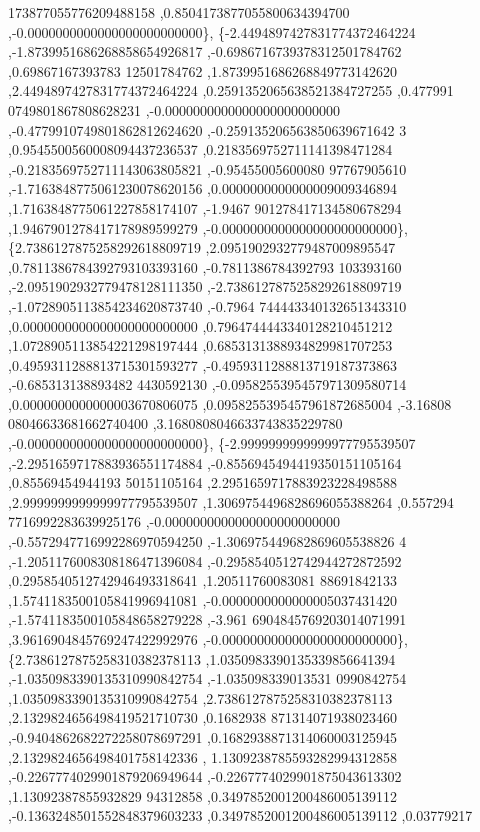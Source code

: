 \begin{DoxyCode}
      173877055776209488158 ,0.8504173877055800634394700 ,-0.0000000000000000000000000\},
\{-2.4494897427831774372464224 ,-1.8739951686268858654926817 ,-0.6986716739378312501784762 ,0.69867167393783
      12501784762 ,1.8739951686268849773142620 ,2.4494897427831774372464224 ,0.2591352065638521384727255 ,0.477991
      0749801867808628231 ,-0.0000000000000000000000000 ,-0.4779910749801862812624620 ,-0.259135206563850639671642
      3 ,0.9545500560008094437236537 ,0.2183569752711141398471284 ,-0.2183569752711143063805821 ,-0.95455005600080
      97767905610 ,-1.7163848775061230078620156 ,0.0000000000000009009346894 ,1.7163848775061227858174107 ,-1.9467
      901278417134580678294 ,1.9467901278417178989599279 ,-0.0000000000000000000000000\},
\{2.7386127875258292618809719 ,2.0951902932779487009895547 ,0.7811386784392793103393160 ,-0.7811386784392793
      103393160 ,-2.0951902932779478128111350 ,-2.7386127875258292618809719 ,-1.0728905113854234620873740 ,-0.7964
      744443340132651343310 ,0.0000000000000000000000000 ,0.7964744443340128210451212 ,1.0728905113854221298197444
       ,0.6853131388934829981707253 ,0.4959311288813715301593277 ,-0.4959311288813719187373863 ,-0.685313138893482
      4430592130 ,-0.0958255395457971309580714 ,0.0000000000000003670806075 ,0.0958255395457961872685004 ,-3.16808
      08046633681662740400 ,3.1680808046633743835229780 ,-0.0000000000000000000000000\},
\{-2.9999999999999977795539507 ,-2.2951659717883936551174884 ,-0.8556945494419350151105164 ,0.85569454944193
      50151105164 ,2.2951659717883923228498588 ,2.9999999999999977795539507 ,1.3069754496828696055388264 ,0.557294
      7716992283639925176 ,-0.0000000000000000000000000 ,-0.5572947716992286970594250 ,-1.306975449682869605538826
      4 ,-1.2051176008308186471396084 ,-0.2958540512742944272872592 ,0.2958540512742946493318641 ,1.20511760083081
      88691842133 ,1.5741183500105841996941081 ,-0.0000000000000005037431420 ,-1.5741183500105848658279228 ,-3.961
      6904845769203014071991 ,3.9616904845769247422992976 ,-0.0000000000000000000000000\},
\{2.7386127875258310382378113 ,1.0350983390135339856641394 ,-1.0350983390135310990842754 ,-1.035098339013531
      0990842754 ,1.0350983390135310990842754 ,2.7386127875258310382378113 ,2.1329824656498419521710730 ,0.1682938
      871314071938023460 ,-0.9404862682272258078697291 ,0.1682938871314060003125945 ,2.1329824656498401758142336 ,
      1.1309238785593282994312858 ,-0.2267774029901879206949644 ,-0.2267774029901875043613302 ,1.13092387855932829
      94312858 ,0.3497852001200486005139112 ,-0.1363248501552848379603233 ,0.3497852001200486005139112 ,0.03779217

\end{DoxyCode}
